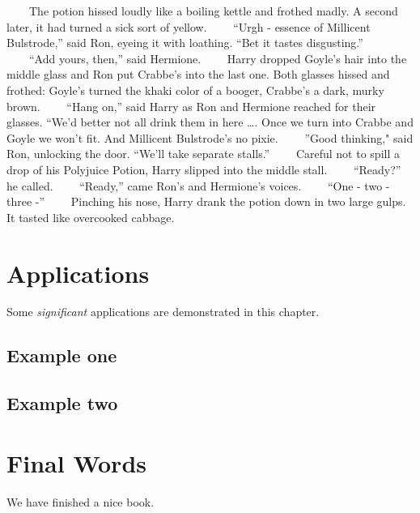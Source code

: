 \documentclass[]{book}
\begin{document}
　　The potion hissed loudly like a boiling kettle and frothed madly. A
second later, it had turned a sick sort of yellow. 　　``Urgh - essence
of Millicent Bulstrode,'' said Ron, eyeing it with loathing. ``Bet it
tastes disgusting.'' 　　``Add yours, then,'' said Hermione. 　　Harry
dropped Goyle's hair into the middle glass and Ron put Crabbe's into the
last one. Both glasses hissed and frothed: Goyle's turned the khaki
color of a booger, Crabbe's a dark, murky brown. 　　``Hang on,'' said
Harry as Ron and Hermione reached for their glasses. ``We'd better not
all drink them in here \ldots{}. Once we turn into Crabbe and Goyle we
won't fit. And Millicent Bulstrode's no pixie. 　　''Good thinking,"
said Ron, unlocking the door. ``We'll take separate stalls.''
　　Careful not to spill a drop of his Polyjuice Potion, Harry slipped
into the middle stall. 　　``Ready?'' he called. 　　``Ready,'' came
Ron's and Hermione's voices. 　　``One - two - three -'' 　　Pinching
his nose, Harry drank the potion down in two large gulps. It tasted like
overcooked cabbage.

\hypertarget{applications}{%
\chapter{Applications}\label{applications}}

Some \emph{significant} applications are demonstrated in this chapter.

\hypertarget{example-one}{%
\section{Example one}\label{example-one}}

\hypertarget{example-two}{%
\section{Example two}\label{example-two}}

\hypertarget{final-words}{%
\chapter{Final Words}\label{final-words}}

We have finished a nice book.


\end{document}
